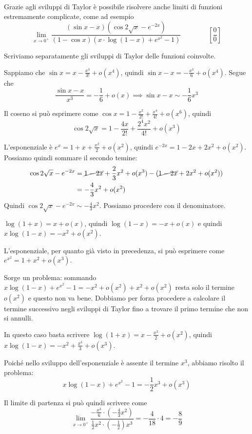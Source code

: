 \begin{example}
Grazie agli sviluppi di Taylor è possibile risolvere anche limiti di funzioni estremamente complicate, come ad esempio
\begin{equation*}
\lim_{x \to 0^+} \frac{(\sin x - x)(\cos 2 \sqrt{x} - e^{-2x})}{(1-\cos x)(x \cdot \log(1-x) + e^{x^2} - 1)} \qquad \qquad \left[\frac{0}{0}\right]
\end{equation*}

Scriviamo separatamente gli sviluppi di Taylor delle funzioni coinvolte.

Sappiamo che $\sin x = x - \frac{x^3}{3!} + o(x^4)$, quindi $\sin x - x = -\frac{x^3}{6} + o(x^4)$. Segue che
\begin{equation*}
\frac{\sin x - x}{x^3} = -\frac{1}{6} + o(x) \implies \sin x - x \sim -\frac{1}{6}x^3
\end{equation*}

Il coseno si può esprimere come $\cos x  = 1 - \frac{x^2}{2!} + \frac{x^4}{4!} + o(x^6)$, quindi
\begin{equation*}
\cos 2\sqrt{x} = 1 - \frac{4x}{2!} + \frac{2^4x^2}{4!} + o(x^3)
\end{equation*}

L'esponenziale è $e^x = 1 + x + \frac{x^2}{2} + o(x^2)$, quindi $e^{-2x} = 1 - 2x + 2x^2 + o(x^2)$. Possiamo quindi sommare il secondo temine:
\begin{align*}
\cos 2\sqrt{x} - e^{-2x} &= \cancel{1 - 2x} + \frac{2}{3}x^2 + o(x^3) - (\cancel{1-2x}+2x^2 + o(x^2)) \\
&= -\frac{4}{3}x^2 + o(x^2)
\end{align*}
Quindi $\cos 2\sqrt{x} - e^{-2x} \sim -\frac{4}{3}x^2$. Possiamo procedere con il denominatore.

$\log(1+x) = x +o(x)$, quindi $\log(1-x) = -x +o(x)$ e quindi $x\log(1-x) = -x^2 +o(x^2)$.

L'esponenziale, per quanto già visto in precedenza, si può esprimere come $e^{x^2} = 1 + x^2 + o(x^3)$.

Sorge un problema: sommando $x\log(1-x)+e^{x^2}-1 = -x^2 + o(x^2) + x^2 + o(x^2)$ resta solo il termine $o(x^2)$ e questo non va bene. Dobbiamo per forza procedere a calcolare il termine successivo negli sviluppi di Taylor fino a trovare il primo termine che non si annulli.

In questo caso basta scrivere $\log(1+x) = x-\frac{x^2}{2}+o(x^2)$, quindi $x\log(1-x) = -x^2+\frac{x^3}{3}+o(x^3)$.

Poiché nello sviluppo dell'esponenziale è assente il termine $x^3$, abbiamo risolto il problema:
\begin{equation*}
x\log(1-x)+e^{x^2}-1 = -\frac{1}{2}x^3 + o(x^3)
\end{equation*}

Il limite di partenza si può quindi scrivere come
\begin{equation*}
\lim_{x \to 0^+} \frac{-\frac{x^3}{6} \cdot \left(-\frac{4}{3}x^2\right)}{\frac{1}{2}x^2 \cdot \left(-\frac{1}{2}\right)x^3} = -\frac{4}{18} \cdot 4 = -\frac{8}{9}
\end{equation*}
\end{example}

